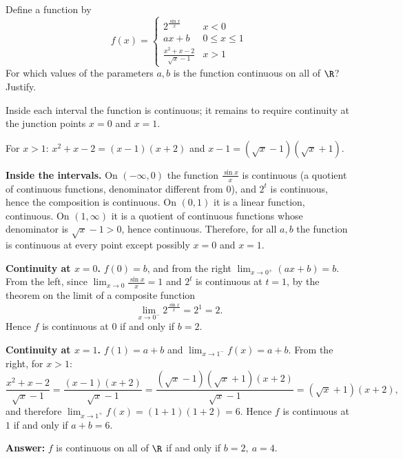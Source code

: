 
\begin{question}
Define a function by
\[ f(x)=\begin{cases}2^{\frac{\sin x}{x}} & x<0\\ ax+b & 0\le x\le 1\\ \frac{x^2+x-2}{\sqrt{x}-1} & x>1\end{cases} \]
For which values of the parameters $a,b$ is the function continuous on all of $\R$? Justify.
\end{question}

\begin{hint}
Inside each interval the function is continuous; it remains to require continuity at the junction points $x=0$ and $x=1$.
\end{hint}

\begin{hint}
For $x>1$: $x^2+x-2=(x-1)(x+2)$ and $x-1=(\sqrt x-1)(\sqrt x+1)$.
\end{hint}

\begin{solution}
\textbf{Inside the intervals.} On $(-\infty,0)$ the function $\frac{\sin x}{x}$ is continuous (a quotient of continuous functions, denominator different from $0$), and $2^t$ is continuous, hence the composition is continuous. On $(0,1)$ it is a linear function, continuous. On $(1,\infty)$ it is a quotient of continuous functions whose denominator is $\sqrt x-1>0$, hence continuous. Therefore, for all $a,b$ the function is continuous at every point except possibly $x=0$ and $x=1$.

\textbf{Continuity at $x=0$.} $f(0)=b$, and from the right $\lim_{x\to0^+}(ax+b)=b$. From the left, since $\lim_{x\to0}\frac{\sin x}{x}=1$ and $2^t$ is continuous at $t=1$, by the theorem on the limit of a composite function
\[ \lim_{x\to0^-}2^{\frac{\sin x}{x}}=2^1=2. \]
Hence $f$ is continuous at $0$ if and only if $b=2$.

\textbf{Continuity at $x=1$.} $f(1)=a+b$ and $\lim_{x\to1^-}f(x)=a+b$. From the right, for $x>1$:
\[ \frac{x^2+x-2}{\sqrt x-1}=\frac{(x-1)(x+2)}{\sqrt x-1}=\frac{(\sqrt x-1)(\sqrt x+1)(x+2)}{\sqrt x-1}=(\sqrt x+1)(x+2), \]
and therefore $\lim_{x\to1^+}f(x)=(1+1)(1+2)=6$. Hence $f$ is continuous at $1$ if and only if $a+b=6$.

\textbf{Answer:} $f$ is continuous on all of $\R$ if and only if $\boxed{b=2,\ a=4}$.
\end{solution}
